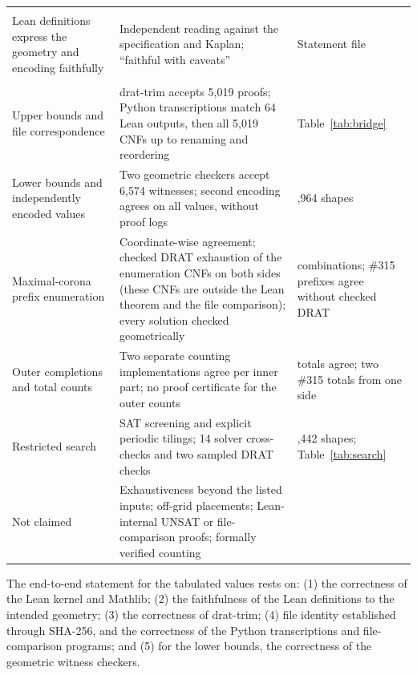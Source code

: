 \documentclass[10pt,a4paper]{article}
\theoremstyle{definition}
\theoremstyle{remark}
\begin{document}
{\begin{longtable}{@{}>{\raggedright\arraybackslash}p{.34\linewidth}
>{\raggedright\arraybackslash}p{.41\linewidth}
>{\raggedright\arraybackslash}p{.19\linewidth}@{}}
\multicolumn{3}{@{}l}{\emph{AI review}}\\*
Lean definitions express the geometry and encoding faithfully &
Independent reading against the specification and Kaplan;
``faithful with caveats'' & Statement file\\
\midrule
\multicolumn{3}{@{}l}{\emph{Finite computation}}\\*
Upper bounds and file correspondence & drat-trim accepts 5,019 proofs;
Python transcriptions match 64 Lean outputs, then all 5,019 CNFs up to
renaming and reordering & Table~\ref{tab:bridge}\\
Lower bounds and independently encoded values & Two geometric checkers
accept 6,574 witnesses; second encoding agrees on all values, without
proof logs & 3,964 shapes\\
Maximal-corona prefix enumeration & Coordinate-wise agreement; checked
DRAT exhaustion of the enumeration CNFs on both sides (these CNFs are
outside the Lean theorem and the file comparison); every solution checked
geometrically & 28 combinations;
\#315 prefixes agree without checked DRAT\\
Outer completions and total counts & Two separate counting implementations
agree per inner part; no proof certificate for the outer counts &
28 totals agree; two \#315 totals from one side\\
Restricted search & SAT screening and explicit periodic tilings; 14
solver cross-checks and two sampled DRAT checks & 3,442 shapes;
Table~\ref{tab:search}\\
\midrule
Not claimed & Exhaustiveness beyond the listed inputs; off-grid
placements; Lean-internal UNSAT or file-comparison proofs; formally
verified counting & \\
\end{longtable}}


The end-to-end statement for the tabulated values rests on: (1) the correctness of the Lean kernel and Mathlib;
(2) the faithfulness of the Lean definitions to the intended geometry;
(3) the correctness of drat-trim;
(4) file identity established through SHA-256, and the correctness of the
Python transcriptions and file-comparison programs; and
(5) for the lower bounds, the correctness of the geometric witness checkers.
\end{document}
